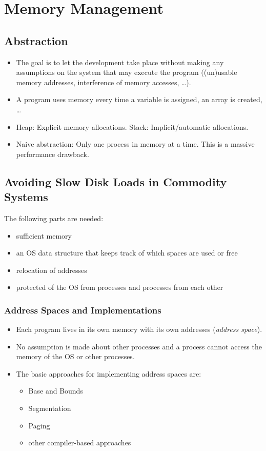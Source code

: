 
\chapter{Memory Management}
	\section{Abstraction}
		\begin{itemize}
			\item The goal is to let the development take place without making any assumptions on the system that may execute the program ((un)usable memory addresses, interference of memory accesses, \dots).
			\item A program uses memory every time a variable is assigned, an array is created, \dots
			\item Heap: Explicit memory allocations. Stack: Implicit/automatic allocations.
			\item Naive abstraction: Only one process in memory at a time. This is a massive performance drawback.
		\end{itemize}

	\section{Avoiding Slow Disk Loads in Commodity Systems}
		The following parts are needed:
		\begin{itemize}
			\item sufficient memory
			\item an OS data structure that keeps track of which spaces are used or free
			\item relocation of addresses
			\item protected of the OS from processes and processes from each other
		\end{itemize}


	\subsection{Address Spaces and Implementations}
		\begin{itemize}
			\item Each program lives in its own memory with its own addresses (\textit{address space}).
			\item No assumption is made about other processes and a process cannot access the memory of the OS or other processes.
			\item The basic approaches for implementing address spaces are:
				\begin{itemize}
					\item Base and Bounds
					\item Segmentation
					\item Paging
					\item other compiler-based approaches
				\end{itemize}
		\end{itemize}

